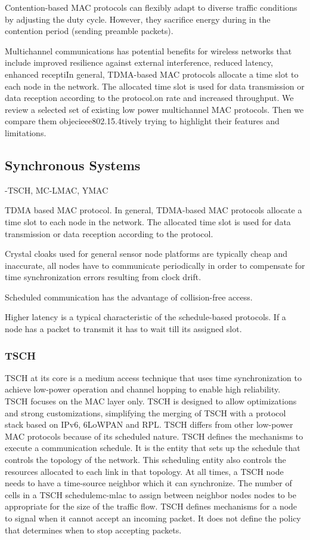 Contention-based MAC protocols can flexibly adapt to diverse traffic conditions by adjusting the duty cycle. However, they sacrifice energy during in the contention period (sending preamble packets). \cite{y-mac}

Multichannel communications has potential benefits for wireless networks that include improved resilience against external interference, reduced latency, enhanced receptiIn general, TDMA-based MAC protocols allocate a time slot to each node in the network. The allocated time slot is used for data transmission or data reception according to the protocol.on rate and increased throughput. We review a selected set of existing low power multichannel MAC protocols. Then we compare them objecieee802.15.4tively trying to highlight their features and limitations. 

\subsection{Synchronous Systems}
-TSCH, MC-LMAC, YMAC

TDMA based MAC protocol.
In general, TDMA-based MAC protocols allocate a time slot to each node in the network. The allocated time slot is used for data transmission or data reception according to the protocol. \cite{y-mac}

Crystal cloaks used for general sensor node platforms are typically cheap and inaccurate, all nodes have to communicate periodically in order to compensate for time synchronization errors resulting from clock drift. \cite{y-mac}

Scheduled communication has the advantage of collision-free access.

Higher latency is a typical characteristic of the schedule-based protocols. If a node has a packet to transmit it has to wait till its assigned slot.

\subsubsection{TSCH}
TSCH at its core is a medium access technique that uses time synchronization to achieve low-power operation and channel hopping to enable high reliability. TSCH focuses on the MAC layer only. TSCH is designed to allow optimizations and strong customizations, simplifying the merging of TSCH with a protocol stack based on IPv6, 6LoWPAN and RPL. TSCH differs from other low-power MAC protocols because of its scheduled nature. TSCH defines the mechanisms to execute a communication schedule. It is the entity that sets up the schedule that controls the topology of the network. This scheduling entity also controls the resources allocated to each link in that topology. At all times, a TSCH node needs to have a time-source neighbor which it can synchronize. The number of cells in a TSCH schedulemc-mlac  to assign between neighbor nodes nodes to be appropriate for the size of the traffic flow. TSCH defines mechanisms for a node to signal when it cannot accept an incoming packet. It does not define the policy that determines when to stop accepting packets. 

